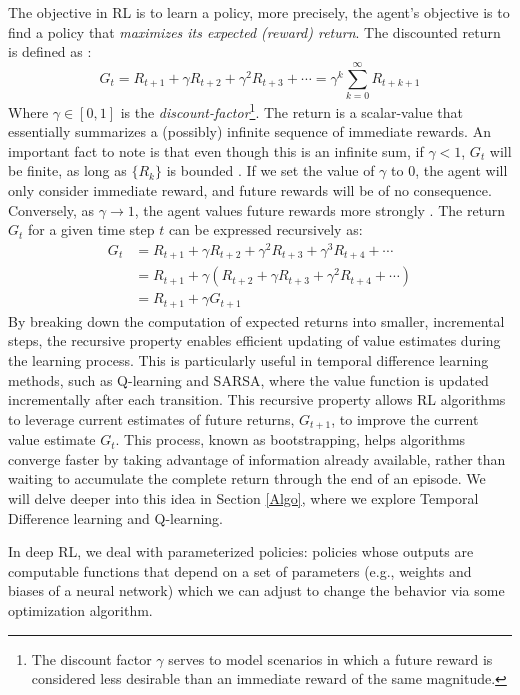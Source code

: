 The objective in RL is to learn a policy, more precisely, the agent's objective is to find a policy that \textit{maximizes its expected (reward) return}. The discounted return is defined as \cite{RL}:
\begin{equation}
    G_t = R_{t+1} + \gamma R_{t+2 } + \gamma^2 R_{t+3 } + \cdots = \gamma^k \sum_{k=0}^{\infty} R_{t+k+1}
\end{equation}
Where $\gamma \in [0,1]$ is the \textit{discount-factor}\footnote{ The discount factor $\gamma$ serves to model scenarios in which a future reward is considered less desirable than an immediate reward of the same magnitude.}.
The return is a scalar-value that essentially summarizes a (possibly) infinite sequence of immediate rewards. 
An important fact to note is that even though this is an infinite sum, if $\gamma < 1$, $G_t$ will be finite, as long as $\{R_k\}$ is bounded \cite{RL}. If we set the value of $\gamma$ to $0$, the agent will only consider immediate reward, and future rewards will be of no consequence. Conversely, as  $\gamma \to 1$, the agent values future rewards more strongly \cite{RL}. The return $G_t$ for a given time step $t$ can be expressed recursively as:
\begin{align}
    G_t &= R_{t+1} + \gamma R_{t+2} + \gamma^2 R_{t+3} + \gamma^3 R_{t+4} + \cdots  \nonumber \\
    &= R_{t+1} + \gamma (R_{t+2} + \gamma R_{t+3} + \gamma^2 R_{t+4} + \cdots) \nonumber \\
    &= R_{t+1} + \gamma G_{t+1} \label{return}
\end{align}
By breaking down the computation of expected returns into smaller, incremental steps, the recursive property enables efficient updating of value estimates during the learning process. This is particularly useful in temporal difference learning methods, such as Q-learning and SARSA, where the value function is updated incrementally after each transition. This recursive property allows RL algorithms to leverage current estimates of future returns, $G_{t+1}$, to improve the current value estimate $G_t$. This process, known as bootstrapping, helps algorithms converge faster by taking advantage of information already available, rather than waiting to accumulate the complete return through the end of an episode. We will delve deeper into this idea in Section \ref{Algo}, where we explore Temporal Difference learning and Q-learning.


In deep RL, we deal with parameterized policies: policies whose outputs are computable functions that depend on a set of parameters (e.g., weights and biases of a neural network) which we can adjust to change the behavior via some optimization algorithm. 

